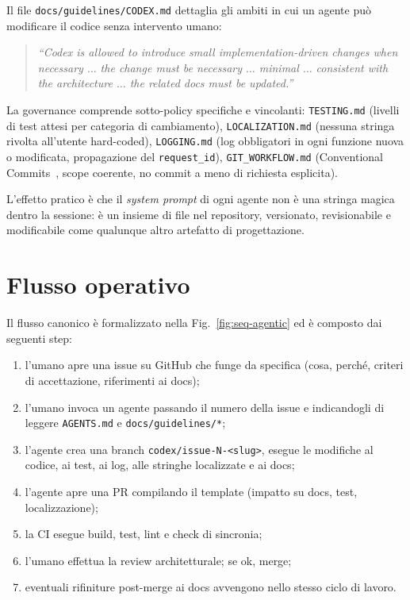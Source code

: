 Il file \texttt{docs/guidelines/CODEX.md} dettaglia gli ambiti in cui un agente
può modificare il codice senza intervento umano:
\begin{quote}\small\itshape
``Codex is allowed to introduce small implementation-driven changes when
necessary $\dots$ the change must be necessary $\dots$ minimal $\dots$
consistent with the architecture $\dots$ the related docs must be updated.''
\end{quote}

La governance comprende sotto-policy specifiche e vincolanti:
\texttt{TESTING.md} (livelli di test attesi per categoria di cambiamento),
\texttt{LOCALIZATION.md} (nessuna stringa rivolta all'utente hard-coded),
\texttt{LOGGING.md} (log obbligatori in ogni funzione nuova o modificata,
propagazione del \texttt{request\_id}), \texttt{GIT\_WORKFLOW.md} (Conventional
Commits~\cite{conventionalcommits}, scope coerente, no commit a meno di
richiesta esplicita).

L'effetto pratico è che il \emph{system prompt} di ogni agente non è una
stringa magica dentro la sessione: è un insieme di file nel repository,
versionato, revisionabile e modificabile come qualunque altro artefatto di
progettazione.

\section{Flusso operativo}
Il flusso canonico è formalizzato nella Fig.~\ref{fig:seq-agentic} ed è composto
dai seguenti step:
\begin{enumerate}
  \item l'umano apre una issue su GitHub che funge da specifica (cosa,
        perché, criteri di accettazione, riferimenti ai docs);
  \item l'umano invoca un agente passando il numero della issue e indicandogli
        di leggere \texttt{AGENTS.md} e \texttt{docs/guidelines/*};
  \item l'agente crea una branch \texttt{codex/issue-N-<slug>}, esegue le
        modifiche al codice, ai test, ai log, alle stringhe localizzate e ai
        docs;
  \item l'agente apre una PR compilando il template (impatto su docs, test,
        localizzazione);
  \item la CI esegue build, test, lint e check di sincronia;
  \item l'umano effettua la review architetturale; se ok, merge;
  \item eventuali rifiniture post-merge ai docs avvengono nello stesso
        ciclo di lavoro.
\end{enumerate}

